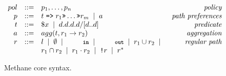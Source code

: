 \documentclass[numbers, 10pt, preprint]{sigplanconf}
\newcommand{\sysname}{{\small \sf Methane}\xspace}
\newcommand{\KW}[1]{\texttt{\small\bfseries{#1}}}
\newcommand{\Prefer}{\texttt{>>}}
\newcommand{\Path}{\texttt{=>}}
\newcommand{\In}{\KW{in}}
\newcommand{\Out}{\KW{out}}
\newcommand{\NOT}{\texttt{!}}
\renewcommand{\path}[2]{ #1 \mapsto \ensuremath{#2} }
\newcommand{\BNFALT}{\;\;|\;\;}
\begin{document}
\begin{figure}[t]\small
  \begin{minipage}[t]{\linewidth}
  \vspace*{-1\baselineskip}
  \[ \begin{array}{rclr}
     pol     &::=& p_1, \dots, p_n & \textit{policy} \\
     p       &::=& t \hspace{.3em} \Path \hspace{.3em} r_1 \Prefer \dots \Prefer r_m \BNFALT a & \textit{path preferences}  \\
     t       &::=& \$x \BNFALT d.d.d.d/[d..d] \hspace{1.5em} & \textit{predicate} \\
     a      &::=& agg(t, r_1 \rightarrow r_2) & \textit{aggregation} \\
     r       &::=& l \BNFALT \emptyset \BNFALT \In \BNFALT \Out \BNFALT r_1 \cup r_2 \BNFALT & \textit{regular path} \\
             &   & r_1 \cap r_2 \BNFALT r_1 \cdot r_2 \BNFALT \NOT r \BNFALT r^* \\
  \end{array} \]%

  \end{minipage}
  \vspace{-.3em}
  \caption{\sysname core syntax.}
  \label{fig:syntax}
\end{figure}%




\newcommand{\state}[4]{\node[state,#3](#1)[#4]{#2};}
\newcommand{\transition}[4]{\path[->] (#1) edge [#4] node {#3} (#2);}
\end{document}
